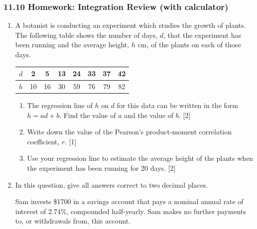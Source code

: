 \documentclass[12pt, twoside]{article}
\begin{document}
\subsubsection*{11.10 Homework: Integration Review (with calculator)}

\begin{enumerate}[itemsep=0.15cm]

\item[1.] A botanist is conducting an experiment which studies the growth of plants.
The following table shows the number of days, $d$, that the experiment has been running
and the average height, $h$ cm, of the plants on each of those days.

\renewcommand{\arraystretch}{1.2}
\begin{center}
\begin{tabular}{|c|c|c|c|c|c|c|c|}
\hline
$d$ & 2 & 5 & 13 & 24 & 33 & 37 & 42 \\
\hline
$h$ & 10 & 16 & 30 & 59 & 76 & 79 & 82 \\
\hline
\end{tabular}
\end{center}
\renewcommand{\arraystretch}{1.0}

\begin{enumerate}[itemsep=0.1cm]
  \item[(a)] The regression line of $h$ on $d$ for this data can be written in the form
  $h = ad + b$. Find the value of $a$ and the value of $b$. \hfill [2]
  \item[(b)] Write down the value of the Pearson's product-moment correlation \\
  coefficient, $r$. \hfill [1]
  \item[(c)] Use your regression line to estimate the average height of the plants when
  the experiment has been running for 20 days. \hfill [2]
\end{enumerate}


\newpage

\item[2.] In this question, give all answers correct to two decimal places.

Sam invests \$1700 in a savings account that pays a nominal annual rate of interest
of 2.74\%, compounded half-yearly. Sam makes no further payments to, or withdrawals
from, this account.


\end{enumerate}
\end{document}

